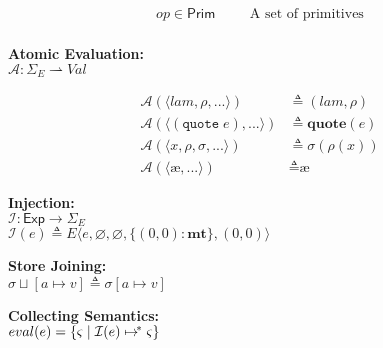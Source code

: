 \documentclass[12pt,draft]{article}
\newcommand\mae{\ensuremath{\text{\ae}}}
\newcommand{\quotesyn}[1]{(\texttt{quote}\;#1)}
\newcommand{\store}[0]{\sigma}
\begin{document}
{\begin{multicols*}{2}
\begin{center}
\begin{align*}
  op \in \textsf{Prim} &\;\;\;\;\;\; \text{A set of primitives} \\
\end{align*}
\end{center}
\vspace{-7mm}
\begin{center}
  \textbf{Atomic Evaluation:} \\
  $\mathcal{A} : \Sigma_E \rightharpoonup \textit{Val}$
\vspace{-7mm}
\end{center}
\begin{align*}
  \mathcal{A}(\langle lam , \rho , ... \rangle)  &\triangleq (lam , \rho) \\
  \mathcal{A}(\langle \quotesyn{e} , ... \rangle) &\triangleq \textbf{quote}(e) \\
  \mathcal{A}(\langle x, \rho , \sigma , ... \rangle) &\triangleq \sigma(\rho(x)) \\
  \mathcal{A}(\langle \mae , ... \rangle) &\triangleq \mae
\end{align*}
\vspace{-9mm}
\begin{center}
\textbf{Injection:} \\
$\mathcal{I} : \textsf{Exp} \rightarrow \Sigma_E$ \\
$\mathcal{I}(e) \triangleq E\langle e , \varnothing , \varnothing , \{(0, 0) : \textbf{mt}\} , (0, 0) \rangle$
\end{center}
\vspace{-8mm}
\begin{center}
  \textbf{Store Joining:} \\
  $\store \sqcup [a \mapsto v] \triangleq \store[a \mapsto v]$ \\
\end{center}
\begin{center}
  \textbf{Collecting Semantics:} \\
  $eval(e) = \{\varsigma \;|\; \mathcal{I}(e) \mapsto\hspace{-1.5mm}^*\; \varsigma \}$
\end{center}
\vspace{-10mm}



\end{multicols*}}
\end{document}
